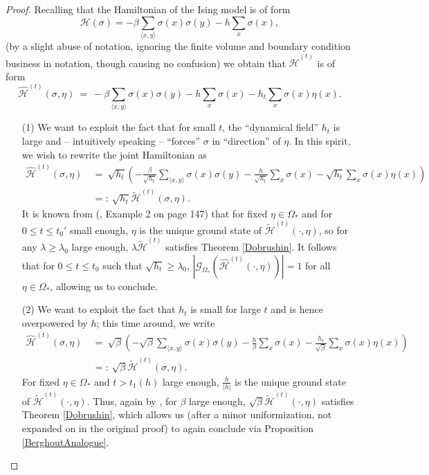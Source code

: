 \documentclass[12pt]{article}
\newcommand{\G}{\mathcal{G}}
\renewcommand{\H}{\mathcal{H}}
\newcommand{\oklepaj}[1]{\left(#1\right)}
\newcommand{\pika}{\boldsymbol{\cdot}}
\newcommand{\1}{\mathbbm{1}}
\renewcommand{\sp}[1]{\langle #1\rangle}
\newcommand{\5}{\vspace{0.5cm}}
\renewcommand{\tilde}{\widetilde}
\renewcommand{\hat}{\widehat}
\theoremstyle{definition}
\begin{document}
\begin{proof}
Recalling that the Hamiltonian of the Ising model is of form 
$$\H(\sigma)=-\beta\sum_{\sp{x,y}}\sigma(x)\sigma(y)-h\sum_{x}\sigma(x),$$ 
(by a slight abuse of notation, ignoring the finite volume and boundary condition business in notation, though causing no confusion) we obtain that $\hat{\H}^{(t)}$ is of form
$$\hat{\H}^{(t)}(\sigma,\eta) ~=~ -\beta\sum_{\sp{x,y}}\sigma(x)\sigma(y)-h\sum_{x}\sigma(x) - h_t\sum_x \sigma(x)\eta(x).$$
\begin{itemize}
	\item[(1)] We want to exploit the fact that for small $t$, the ``dynamical field'' $h_t$ is large and -- intuitively speaking -- ``forces'' $\sigma$ in ``direction'' of $\eta$. In this spirit, we wish to rewrite the joint Hamiltonian as
\begin{align*}
\hat{\H}^{(t)}(\sigma,\eta) ~&=~ \sqrt{h_t}\oklepaj{-\frac{\beta}{\sqrt{h_t}}\sum_{\sp{x,y}}\sigma(x)\sigma(y)-\frac{h}{\sqrt{h_t}}\sum_{x}\sigma(x)-\sqrt{h_t}\sum_{x}\sigma(x)\eta(x)} \\
&=:~ \sqrt{h_t}\tilde{\H}^{(t)}(\sigma,\eta).
\end{align*}
It is known from (\cite{Geo}, Example 2 on page 147) that for fixed $\eta\in\Omega_*$ and for $0\leq t\leq t_0'$ small enough, $\eta$ is the unique ground state of $\tilde{\H}^{(t)}(\pika,\eta)$, so for any $\lambda\geq\lambda_0$ large enough, $\lambda\tilde{\H}^{(t)}$ satisfies Theorem \ref{Dobrushin}. It follows that for $0\leq t\leq t_0$ such that $\sqrt{h_t}\geq \lambda_0$, $|\G_{\Omega_*}(\hat{\H}^{(t)}(\pika,\eta))|=1$ for all $\eta\in\Omega_*$, allowing us to conclude.
	\item[(2)] We want to exploit the fact that $h_t$ is small for large $t$ and is hence overpowered by $h$; this time around, we write
\begin{align*}
\hat{\H}^{(t)}(\sigma,\eta) ~&=~ \sqrt{\beta}\oklepaj{-\sqrt{\beta}\sum_{\sp{x,y}}\sigma(x)\sigma(y)-\frac{h}{\beta}\sum_{x}\sigma(x)-\frac{h_t}{\sqrt{\beta}}\sum_{x}\sigma(x)\eta(x)} \\
&=:~ \sqrt{\beta}\tilde{\H}^{(t)}(\sigma,\eta).
\end{align*}
For fixed $\eta\in\Omega_*$ and $t>t_1(h)$ large enough, $\frac{h}{|h|}$ is the unique ground state of $\tilde{\H}^{(t)}(\pika,\eta)$. Thus, again by \cite{Geo}, for $\beta$ large enough, $\sqrt{\beta}\tilde{\H}^{(t)}(\pika,\eta)$ satisfies Theorem \ref{Dobrushin}, which allows us (after a minor uniformization, not expanded on in the original proof) to again conclude via Proposition \ref{BerghoutAnalogue}.
\end{itemize}
\end{proof}
\end{document}
